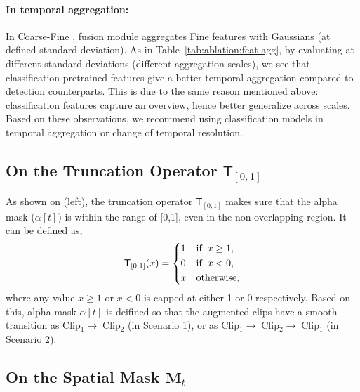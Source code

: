 \documentclass[letterpaper]{article} \usepackage{aaai23}  \usepackage{times}  \usepackage{helvet}  \usepackage{courier}  \usepackage[hyphens]{url}  \usepackage{graphicx} \urlstyle{rm} \def\UrlFont{\rm}  \usepackage{natbib}  \usepackage{caption} \frenchspacing  \setlength{\pdfpagewidth}{8.5in}  \setlength{\pdfpageheight}{11in}  \usepackage{algorithm}
\newcommand{\tref}[1]{Table~\ref{#1}}
\newcommand{\ch}{}
\begin{document}
\paragraph{In temporal aggregation:} In Coarse-Fine \cite{kahatapitiya2021coarse}, fusion module aggregates Fine features with Gaussians (at defined standard deviation). As in \tref{tab:ablation:feat-agg}, by evaluating at different standard deviations (different aggregation scales), we see that classification pretrained features give a better temporal aggregation compared to detection counterparts. This is due to the same reason mentioned above: classification features capture an overview, hence better generalize across scales. \ch{Based on these observations, we recommend using classification models in temporal aggregation or change of temporal resolution.}

\subsection{On the Truncation Operator $\mathsf{T}_{[0,1]}$}
\label{app:a}

As shown on  (left), the truncation operator $\mathsf{T}_{[0,1]}$ makes sure that the alpha mask ($\alpha[t]$) is within the range of [0,1], even in the non-overlapping region. It can be defined as,
{\small
\begin{equation*}
\label{eq:alpha}
\mathsf{T}_{[0,1]}(x)=
\begin{dcases}
1 &\text{if}\;\; x\geq 1,\\
0 &\text{if}\;\;  x< 0,\\
x & \text{otherwise},\\
\end{dcases}  
\end{equation*}
}where any value $x\geq1$ or $x<0$ is capped at either 1 or 0 respectively. Based on this, alpha mask $\alpha[t]$ is deifined so that the augmented clips have a smooth transition as Clip$_1\rightarrow\;$Clip$_2$ (in Scenario 1), or as Clip$_1\rightarrow\;$Clip$_2\rightarrow\;$Clip$_1$ (in Scenario 2).

\subsection{On the Spatial Mask $\mathbf{M}_t$}
\label{app:b}
\end{document}
